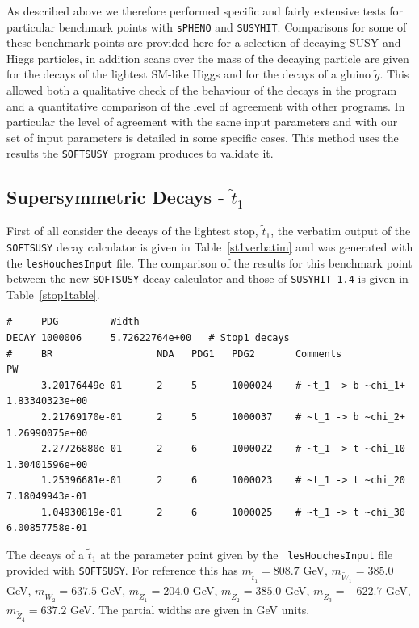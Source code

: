 \documentclass[final,3p,times,pdflatex]{elsarticle}
\def\SOFTSUSY{{\tt SOFTSUSY}}
\def\code#1{{\tt #1}}
\begin{document}
As described above we therefore performed specific and fairly extensive tests for particular benchmark
points with \code{sPHENO} and \code{SUSYHIT}. Comparisons for some of these benchmark points are provided here for a selection of decaying SUSY and Higgs particles, in addition scans over the mass of the decaying particle are given for the decays of the lightest SM-like Higgs and for the decays of a gluino $\tilde{g}$. This allowed both a qualitative check of the behaviour of the decays in the program and a quantitative comparison of the level of agreement with other programs. In particular the level of agreement with the same input parameters and with our set of input parameters is detailed in some specific cases. This method uses the results the \SOFTSUSY~program produces to validate it. 


\subsection{Supersymmetric Decays - $\tilde{t}_1$}

First of all consider the decays of the lightest stop, $\tilde{t}_1$, the
verbatim output of the {\tt SOFTSUSY} decay calculator is given in
Table~\ref{st1verbatim} and was generated with the {\tt lesHouchesInput}
file. The comparison of the results for this benchmark point between the new
{\tt SOFTSUSY} decay calculator and those of {\tt SUSYHIT-1.4} is given in
Table~\ref{stop1table}. 


\begin{table}
\begin{verbatim}
#     PDG         Width             
DECAY 1000006     5.72622764e+00   # Stop1 decays
#     BR                  NDA   PDG1   PDG2       Comments                PW                
      3.20176449e-01      2     5      1000024    # ~t_1 -> b ~chi_1+     1.83340323e+00    
      2.21769170e-01      2     5      1000037    # ~t_1 -> b ~chi_2+     1.26990075e+00    
      2.27726880e-01      2     6      1000022    # ~t_1 -> t ~chi_10     1.30401596e+00    
      1.25396681e-01      2     6      1000023    # ~t_1 -> t ~chi_20     7.18049943e-01    
      1.04930819e-01      2     6      1000025    # ~t_1 -> t ~chi_30     6.00857758e-01    
\end{verbatim}
\caption{The decays of a $\tilde{t}_1$ at the parameter point given by the {\tt
    lesHouchesInput} file provided with {\tt SOFTSUSY}. For reference this has
  $m_{\tilde{t}_1} = 808.7$ GeV, $m_{\tilde{W}_1} = 385.0$ GeV,
  $m_{\tilde{W}_2} = 637.5$ GeV, $m_{\tilde{Z}_1} = 204.0$ GeV,
  $m_{\tilde{Z}_2} = 385.0$ GeV, $m_{\tilde{Z}_3} = -622.7$ GeV,
  $m_{\tilde{Z}_4} = 637.2$ GeV. The partial widths are given in GeV units.} \label{st1verbatim}
\end{table}
\end{document}
